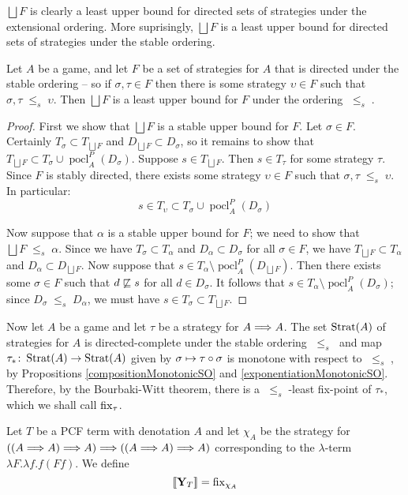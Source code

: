 \documentclass{entcs} \usepackage{prentcsmacro}
\newcommand{\stle}{{\;\le_s\;}}
\newcommand{\exlub}{\bigsqcup}
\DeclareMathOperator{\pocl}{pocl}
\newcommand{\0}{{\mathtt{0}}}
\begin{document}
$\exlub F$ is clearly a least upper bound for directed sets of strategies under the extensional ordering.  More suprisingly, $\exlub F$ is a least upper bound for directed sets of strategies under the stable ordering.

\begin{proposition}
  \label{exlubIsStlub}
  Let $A$ be a game, and let $F$ be a set of strategies for $A$ that is directed under the stable ordering -- so if $\sigma,\tau\in F$ then there is some strategy $\upsilon\in F$ such that $\sigma,\tau\stle\upsilon$.  Then $\exlub F$ is a least upper bound for $F$ under the ordering $\stle$.
\end{proposition}
  \begin{proof}
    First we show that $\exlub F$ is a stable upper bound for $F$.  Let $\sigma\in F$.  Certainly $T_\sigma\subset T_{\exlub F}$ and $D_{\exlub F}\subset D_\sigma$, so it remains to show that $T_{\exlub F}\subset T_\sigma\cup \pocl_A^P(D_\sigma)$.  Suppose $s\in T_{\exlub F}$.  Then $s\in T_\tau$ for some strategy $\tau$.  Since $F$ is stably directed, there exists some strategy $\upsilon\in F$ such that $\sigma,\tau\stle\upsilon$.  In particular:
    \[
      s\in T_\upsilon \subset T_\sigma \cup \pocl_A^P(D_\sigma)
      \]

    Now suppose that $\alpha$ is a stable upper bound for $F$; we need to show that $\exlub F\stle\alpha$.  Since we have $T_\sigma\subset T_\alpha$ and $D_\alpha\subset D_\sigma$ for all $\sigma\in F$, we have $T_{\exlub F}\subset T_\alpha$ and $D_\alpha\subset D_{\exlub F}$.  Now suppose that $s\in T_\alpha\setminus\pocl_A^P(D_{\exlub F})$.  Then there exists some $\sigma\in F$ such that $d\not\sqsubseteq s$ for all $d\in D_\sigma$.  It follows that $s\in T_\alpha\setminus\pocl_A^P(D_\sigma)$; since $D_\sigma\stle D_\alpha$, we must have $s\in T_\sigma\subset T_{\exlub F}$. 
  \end{proof}

Now let $A$ be a game and let $\tau$ be a strategy for $A\Longrightarrow A$.  The set $\operatorname{Strat}(A)$ of strategies for $A$ is directed-complete under the stable ordering $\stle$ and map $\tau_*\colon\operatorname{Strat}(A)\to\operatorname{Strat}(A)$ given by $\sigma\mapsto\tau \circ \sigma$ is monotone with respect to $\stle$, by Propositions \ref{compositionMonotonicSO} and \ref{exponentiationMonotonicSO}.  Therefore, by the Bourbaki-Witt theorem, there is a $\stle$-least fix-point of $\tau_*$, which we shall call $\operatorname{fix}_\tau$.

Let $T$ be a PCF term with denotation $A$ and let $\chi_A$ be the strategy for $((A \Longrightarrow A) \Longrightarrow A) \Longrightarrow ((A \Longrightarrow A) \Longrightarrow A)$ corresponding to the $\lambda$-term $\lambda F.\lambda f. f(F f)$.  We define
\[
  \left\llbracket\mathbf{Y}_T\right\rrbracket = \operatorname{fix}_{\chi_A}
  \]
\end{document}
